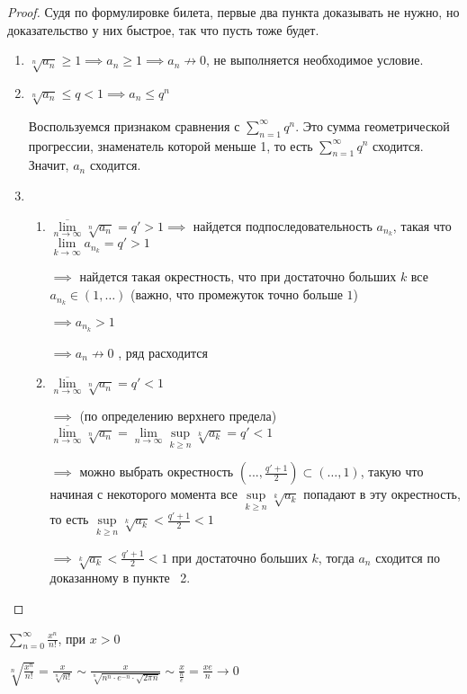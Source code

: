 \begin{proof}\slashns
	
	Судя по формулировке билета, первые два пункта доказывать не нужно, но доказательство у них быстрое, так что пусть тоже будет.
	\begin{enumerate}
		\item $\sqrt[n]{a_n} \ge 1 \implies a_n \ge 1 \implies a_n \not\to 0$, не выполняется необходимое условие.
		
		\item $\sqrt[n]{a_n} \le q < 1 \implies a_n \le q^n$

		Воспользуемся признаком сравнения с $\sum\limits_{n=1}^{\infty}q^n$. Это сумма геометрической прогрессии, знаменатель которой меньше 1, то есть $\sum\limits_{n=1}^{\infty}q^n$ сходится. Значит, $a_n$ сходится.
		
		
		\item 
		\begin{enumerate}
			\item $\overline{\lim\limits_{n \to \infty}} \sqrt[n]{a_n} = q' > 1 \implies $ найдется подпоследовательность  $a_{n_k}$, такая что $\lim\limits_{k \to \infty} a_{n_k} = q' > 1$

			$\implies$ найдется такая окрестность, что при достаточно больших $k$ все $a_{n_k} \in (1, \dots)$ (важно, что промежуток точно больше $1$) 

			$\implies a_{n_k} > 1$

			$\implies a_n \not\to 0$ , ряд расходится


			\item $\overline{\lim\limits_{n \to \infty}} \sqrt[n]{a_n} = q'< 1$

			$\implies$ (по определению верхнего предела) $\overline{\lim\limits_{n \to \infty}} \sqrt[n]{a_n} = \lim\limits_{n \to \infty} \sup\limits_{k \ge n} \sqrt[k]{a_k} = q' < 1$
		

			$\implies$ можно выбрать окрестность $(..., \frac{q' + 1}{2}) \subset (\dots, 1)$, такую что начиная с некоторого момента все $\sup\limits_{k \ge n} \sqrt[k]{a_k}$ попадают в эту окрестность, то есть $\sup\limits_{k \ge n} \sqrt[k]{a_k} < \frac{q' + 1}{2} < 1$

			$\implies \sqrt[k]{a_k} < \frac{q' + 1}{2} < 1$ при достаточно больших $k$, тогда $a_n$ сходится по доказанному в пункте~ 2.

	\end{enumerate}
	\end{enumerate}
\end{proof}
\begin{example}\slashns
	
	$\sum\limits_{n = 0}^{\infty} \frac{x^n}{n!}$, при $x > 0$
	
		
	$\sqrt[n]{\frac{x^n}{n!}} = \frac{x}{\sqrt[n]{n!}} \sim \frac{x}{\sqrt[n]{n^n\cdot e^{-n} \cdot \sqrt{2\pi n}}}\sim \frac x {\frac ne} = \frac{xe}{n} \to 0$
\end{example}


